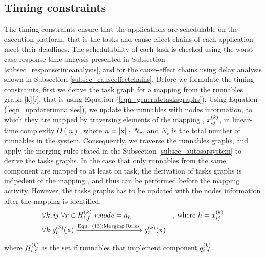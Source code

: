 \subsection{Timing constraints}
The timing constraints ensure that the applications are schedulable on the execution platform, that is the tasks and cause-effect chains of each application meet their deadlines. The schedulability of each task is checked using the worst-case response-time anlaysis presented in Subsection \ref{subsec_responsetimeanalysis}, and for the cause-effect chains using delay analysis shown in Subsection \ref{subsec_causeeffectchains}. Before we formulate the timing constraints, first we derive the task graph for a mapping \ttx from the runnables graph [k][r], that is using Equation (\ref{eqn_generatetasksgraphs}).  Using Equation (\ref{eqn_uprdaterunnables}), we update the runnables with nodes information, to which they are mapped by traversing elements of the mapping \ttx, $x^{(k)}_{ij}$, in linear-time complexity $O(n)$, where $n=|\textbf{x}|*N_r$, and $N_r$ is the total number of runnables in the system. Consequently, we traverse the runnables graphs, and apply the merging rules stated in the Subsection \ref{subsec_autosarsystem} to derive the tasks graphs. In the case that only runnables from the same component are mapped to at least on task, the derivation of tasks graphs is indpedent of the mapping \ttx, and thus can be performed before the mapping activity. However, the tasks graphs has to be updated with the nodes information after the mapping \ttx is identified.
\begin{align}
\label{eqn_uprdaterunnables}
&\forall k,ij\ \forall r\in \sss{H}[k][i,j]\ r.node = n_h& \mbox{, where } h=\xkij\\
\label{eqn_generatetasksgraphs}
&\forall k\ \sss{g}[k][r](\x)\xrightarrow{\text{Eqn. (13);Merging Rules}}\sss{g}[k][\tau](\x)
\end{align}

where $\sss{H}[k][i,j]$ is the set if runnables that implement component $\sss{q}[k][i,j]$.


